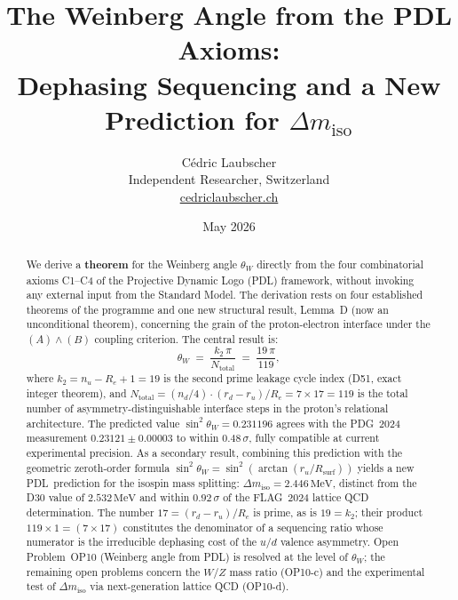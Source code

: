 \documentclass[12pt,a4paper]{article}
\theoremstyle{plain}
\theoremstyle{definition}
\theoremstyle{remark}
\newcommand{\PDL}{\textsc{PDL}}
\newcommand{\Rsurf}{R_{\mathrm{surf}}}
\renewcommand{\Re}{R_e}
\newcommand{\ru}{r_u}
\newcommand{\rd}{r_d}
\renewcommand{\nu}{n_u}
\newcommand{\nd}{n_d}
\newcommand{\thetaW}{\theta_W}
\newcommand{\sinW}{\sin^2\!\thetaW}
\newcommand{\Ntot}{N_{\mathrm{total}}}
\newcommand{\Dmiso}{\Delta m_{\mathrm{iso}}}
\newcommand{\ktwo}{k_2}
\begin{document}

\title{\textbf{The Weinberg Angle from the PDL Axioms:\\
Dephasing Sequencing and a New Prediction for $\Delta m_{\mathrm{iso}}$}}
\author{Cédric Laubscher\\
\small Independent Researcher, Switzerland\\
\small \href{https://cedriclaubscher.ch}{cedriclaubscher.ch}}
\date{May 2026}
\maketitle

\begin{abstract}
We derive a \textbf{theorem} for the Weinberg angle $\thetaW$ directly from the four combinatorial axioms C1--C4 of the Projective Dynamic Logo (\PDL) framework, without invoking any external input from the Standard Model. The derivation rests on four established theorems of the programme and one new structural result, Lemma~D (now an unconditional theorem), concerning the grain of the proton-electron interface under the $(A)\wedge(B)$ coupling criterion. The central result is:
\begin{equation*}
\thetaW \;=\; \frac{\ktwo\,\pi}{\Ntot} \;=\; \frac{19\,\pi}{119},
\end{equation*}
where $\ktwo = \nu - \Re + 1 = 19$ is the second prime leakage cycle index (D51, exact integer theorem), and $\Ntot = (\nd/4)\cdot(\rd-\ru)/\Re = 7\times 17 = 119$ is the total number of asymmetry-distinguishable interface steps in the proton's relational architecture. The predicted value $\sin^2\!\thetaW = 0.231196$ agrees with the PDG~2024 measurement $0.23121 \pm 0.00003$ to within $0.48\,\sigma$, fully compatible at current experimental precision. As a secondary result, combining this prediction with the geometric zeroth-order formula $\sinW = \sin^2(\arctan(\ru/\Rsurf))$ yields a new \PDL\ prediction for the isospin mass splitting: $\Dmiso = 2.446\,\mathrm{MeV}$, distinct from the D30 value of $2.532\,\mathrm{MeV}$ and within $0.92\,\sigma$ of the FLAG~2024 lattice QCD determination. The number $17 = (\rd-\ru)/\Re$ is prime, as is $19 = \ktwo$; their product $119\times 1 = (7\times 17)$ constitutes the denominator of a sequencing ratio whose numerator is the irreducible dephasing cost of the $u/d$ valence asymmetry. Open Problem~OP10 (Weinberg angle from \PDL) is resolved at the level of $\thetaW$; the remaining open problems concern the $W/Z$ mass ratio (OP10-c) and the experimental test of $\Dmiso$ via next-generation lattice QCD (OP10-d).
\end{abstract}
\end{document}
